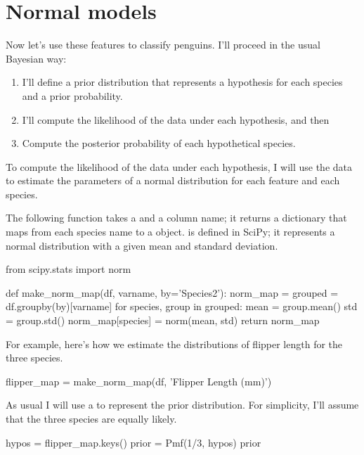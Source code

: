\documentclass[12pt]{book}
\theoremstyle{exercise}
\begin{document}
\section{Normal models}
\label{normal-models}

Now let's use these features to classify penguins. I'll proceed in the
usual Bayesian way:

\begin{enumerate}

\item
  I'll define a prior distribution that represents a hypothesis for each
  species and a prior probability.
\item
  I'll compute the likelihood of the data under each hypothesis, and
  then
\item
  Compute the posterior probability of each hypothetical species.
\end{enumerate}

To compute the likelihood of the data under each hypothesis, I will use
the data to estimate the parameters of a normal distribution for each
feature and each species.

The following function takes a  and a
column name; it returns a dictionary that maps from each species name to
a  object. 
is defined in SciPy; it represents a normal distribution with a given
mean and standard deviation.

\begin{code}
from scipy.stats import norm

def make_norm_map(df, varname, by='Species2'):
    norm_map = {}
    grouped = df.groupby(by)[varname]
    for species, group in grouped:
        mean = group.mean()
        std = group.std()
        norm_map[species] = norm(mean, std)
    return norm_map
\end{code}

For example, here's how we estimate the distributions of flipper length
for the three species.

\begin{code}
flipper_map = make_norm_map(df, 'Flipper Length (mm)')
\end{code}

As usual I will use a  to represent the
prior distribution. For simplicity, I'll assume that the three species
are equally likely.

\begin{code}
hypos = flipper_map.keys()
prior = Pmf(1/3, hypos)
prior
\end{code}
\end{document}

